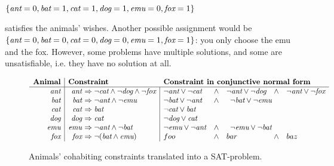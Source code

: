 $\{\text{\em ant}=0, \text{\em bat}=1, \text{\em cat}=1, \text{\em dog}=1, \text{\em emu}=0, \text{\em fox}=1\}$

\noindent satisfies the animals' wishes.
Another possible assignment would be $\{\text{\em ant}=0, \text{\em bat}=0, \text{\em cat}=0, \text{\em dog}=0, \text{\em emu}=1, \text{\em fox}=1\}$: you only choose the emu and the fox. 
 However, some problems have multiple solutions, and some are unsatisfiable, i.e. they have no solution at all.

 \begin{figure}[t]
  $$\begin{array}{r | r @{~} l | l @{\quad \wedge \quad } l @{\quad \wedge \quad} l }
   \textbf{Animal}
                & \multicolumn{2}{l}{\textbf{Constraint}} 
                                        & \multicolumn{3}{l}{\textbf{Constraint in conjunctive normal form}} \\ \hline

    \ant        & \ant &\Rightarrow \neg{}\cat \wedge \neg{}\dog \wedge \neg{}\fox 
    								    & \neg{}\ant \vee \neg{}\cat 
                                        & \neg{}\ant \vee \neg{}\dog 
                                        & \neg{}\ant \vee \neg{}\fox \\

   \bat         & \bat &\Rightarrow \neg{}\ant \wedge \neg{}\emu
   								        & \neg{}\bat \vee \neg{}\ant 
                                        & \multicolumn{2}{l}{\neg{}\bat \vee \neg{}\emu} \\
   \cat         & \cat &\Rightarrow \bat & \multicolumn{3}{l}{\neg{}\cat \vee \bat} \\
   \dog         & \dog &\Rightarrow \cat & \multicolumn{3}{l}{\neg{}\dog \vee \cat} \\
   \emu         & \emu &\Rightarrow \neg{}\ant \wedge \neg{}\bat
   										& \neg{}\emu \vee \neg{}\ant 
                                        & \multicolumn{2}{l}{\neg{}\emu \vee \neg{}\bat} \\
   \fox         & \fox &\Rightarrow \neg (\bat \wedge \emu) 
   									    & foo 
   									    & bar
   									    & baz \\

  \end{array}$$
  \caption{Animals' cohabiting constraints translated into a SAT-problem.}

\end{figure}




